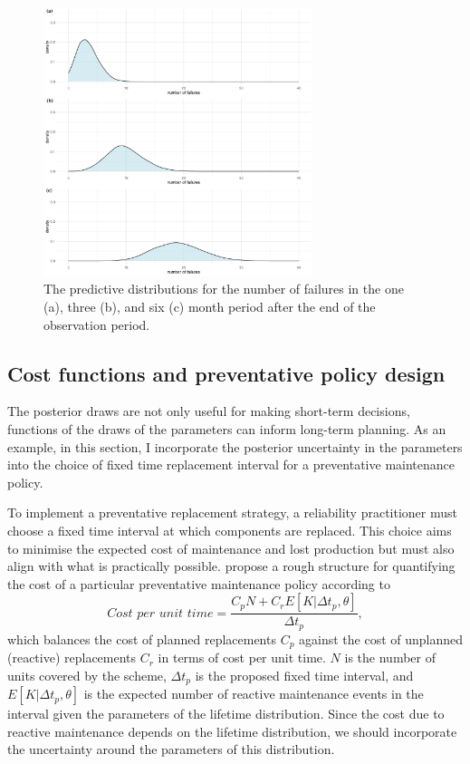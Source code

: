 \begin{figure}
  \centering
  \includegraphics[width=0.7\textwidth]{./figures/ch-3/E-n-failures-densities.pdf}
  \caption{The predictive distributions for the number of failures in the one (a), three (b), and six (c) month period after the end of the observation period.}
  \label{fig:E-Nfailrues-densities}
\end{figure}

\subsection{Cost functions and preventative policy design} \label{subsec:idler-cost-function}

The posterior draws are not only useful for making short-term decisions, functions of the draws of the parameters can inform long-term planning. As an example, in this section, I incorporate the posterior uncertainty in the parameters into the choice of fixed time replacement interval for a preventative maintenance policy.

To implement a preventative replacement strategy, a reliability practitioner must choose a fixed time interval at which components are replaced. This choice aims to minimise the expected cost of maintenance and lost production but must also align with what is practically possible. \citet{jardine2013} propose a rough structure for quantifying the cost of a particular preventative maintenance policy according to
\begin{equation*}
 \textit{Cost per unit time} = \frac{C_p N + C_r E[K|\Delta t_p,\theta]}{\Delta t_p},
\end{equation*}
which balances the cost of planned replacements $C_p$ against the cost of unplanned (reactive) replacements $C_r$ in terms of cost per unit time. $N$ is the number of units covered by the scheme, $\Delta t_p$ is the proposed fixed time interval, and $E[K|\Delta t_p,\theta]$ is the expected number of reactive maintenance events in the interval given the parameters of the lifetime distribution. Since the cost due to reactive maintenance depends on the lifetime distribution, we should incorporate the uncertainty around the parameters of this distribution.

